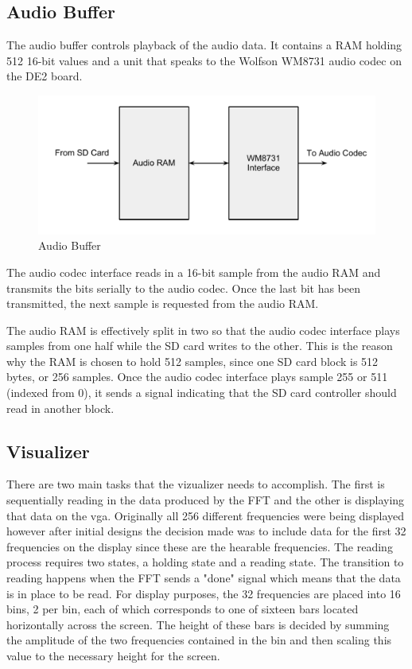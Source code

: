 \documentclass{article}
\begin{document}
\subsection{Audio Buffer}

The audio buffer controls playback of the audio data. It contains a RAM
holding 512 16-bit values and a unit that speaks to the Wolfson WM8731
audio codec on the DE2 board.

\begin{figure}[H]
	\centering
	\includegraphics[scale=0.3]{audio-buffer}
	\caption{Audio Buffer}
\end{figure}

The audio codec interface reads in a 16-bit sample from the audio RAM and
transmits the bits serially to the audio codec. Once the last bit has been
transmitted, the next sample is requested from the audio RAM.

The audio RAM is effectively split in two so that the audio codec interface
plays samples from one half while the SD card writes to the other. This is
the reason why the RAM is chosen to hold 512 samples, since one SD card
block is 512 bytes, or 256 samples. Once the audio codec interface plays 
sample 255 or 511 (indexed from 0), it sends a signal indicating that the 
SD card controller should read in another block.

\subsection{Visualizer} 

There are two main tasks that the vizualizer needs to accomplish.  
The first is sequentially reading in the data produced by the FFT and the 
other is displaying that data on the vga.  Originally all 256 different 
frequencies were being displayed however after initial designs the decision 
made was to include data for the first 32 frequencies on the display since 
these are the hearable frequencies.  The reading process requires two states, 
a holding state and a reading state.  The transition to reading happens when 
the FFT sends a "done" signal which means that the data is in place to be read.  
For display purposes, the 32 frequencies are placed into 16 bins, 2 per bin, 
each of which corresponds to one of sixteen bars located horizontally across 
the screen.  The height of these bars is decided by summing the amplitude of 
the two frequencies contained in the bin and then scaling this value to the 
necessary height for the screen.
\end{document}
